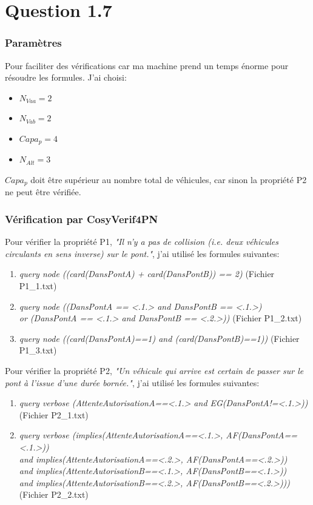 \documentclass[a4paper,11pt]{report}
\begin{document}
\section{Question 1.7}
\subsubsection{Paramètres}
	Pour faciliter des vérifications car ma machine prend un temps énorme pour résoudre les formules. J'ai choisi:
	\begin{itemize}
		\item $N_{Vaa} = 2$
		\item $N_{Vab} = 2$
		\item $Capa_p = 4$
		\item $N_{Alt} = 3$
	\end{itemize}
	
	$Capa_p$ doit être supérieur au nombre total de véhicules, car sinon la propriété P2 ne peut être vérifiée.

\subsubsection{Vérification par CosyVerif4PN}
	Pour vérifier la propriété P1, \textit{"Il n'y a pas de collision (i.e. deux véhicules circulants en sens inverse) sur le pont."}, j'ai utilisé les formules suivantes:
	\begin{enumerate}
		\item \textit{query node ((card(DansPontA) + card(DansPontB)) == 2)} (Fichier P1\_1.txt)
		\item \textit{query node ((DansPontA == <.1.> and DansPontB == <.1.>) 
			\\or (DansPontA == <.1.> and DansPontB == <.2.>))} (Fichier P1\_2.txt)
		\item \textit{query node ((card(DansPontA)==1) and (card(DansPontB)==1))} (Fichier P1\_3.txt)
	\end{enumerate}
	
		Pour vérifier la propriété P2, \textit{"Un véhicule qui arrive est certain de passer sur le pont à l'issue d'une durée bornée."}, j'ai utilisé les formules suivantes:
		\begin{enumerate}
		\item 
			\textit{query verbose (AttenteAutorisationA==<.1.> and EG(DansPontA!=<.1.>))} (Fichier P2\_1.txt)
		\item
			\textit{query verbose (implies(AttenteAutorisationA==<.1.>, AF(DansPontA==<.1.>)) 
			\\and implies(AttenteAutorisationA==<.2.>, AF(DansPontA==<.2.>)) 
			\\and implies(AttenteAutorisationB==<.1.>, AF(DansPontB==<.1.>)) 
			\\and implies(AttenteAutorisationB==<.2.>, AF(DansPontB==<.2.>)))} (Fichier P2\_2.txt)
	\end{enumerate}
	
\end{document}
